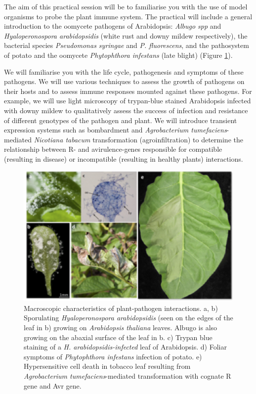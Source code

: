 \documentclass[12pt,]{book}
\theoremstyle{definition}
\theoremstyle{definition}
\theoremstyle{remark}
\begin{document}
The aim of this practical session will be to familiarise you with the
use of model organisms to probe the plant immune system. The practical
will include a general introduction to the oomycete pathogens of
Arabidopsis: \emph{Albugo spp} and \emph{Hyaloperonospora arabidopsidis}
(white rust and downy mildew respectively), the bacterial species
\emph{Pseudomonas syringae} and \emph{P. fluorescens}, and the
pathosystem of potato and the oomycete \emph{Phytophthora infestans}
(late blight) (Figure \ref{fig:leaves}).

We will familiarise you with the life cycle, pathogenesis and symptoms
of these pathogens. We will use various techniques to assess the growth
of pathogens on their hosts and to assess immune responses mounted
against these pathogens. For example, we will use light microscopy of
trypan-blue stained Arabidopsis infected with downy mildew to
qualitatively assess the success of infection and resistance of
different genotypes of the pathogen and plant. We will introduce
transient expression systems such as bombardment and \emph{Agrobacterium
tumefaciens}-mediated \emph{Nicotiana tabacum} transformation
(agroinfiltration) to determine the relationship between R- and
avirulence-genes responsible for compatible (resulting in disease) or
incompatible (resulting in healthy plants) interactions.











\begin{figure}
\includegraphics[width=6.48in]{assets/jones_fig2_prac} \caption{Macroscopic characteristics of plant-pathogen
interactions. a, b) Sporulating \emph{Hyaloperonospora arabidopsidis}
(seen on the edges of the leaf in b) growing on \emph{Arabidopsis
thaliana} leaves. Albugo is also growing on the abaxial surface of the
leaf in b. c) Trypan blue staining of a \emph{H. arabidopsidis-infected}
leaf of Arabidopsis. d) Foliar symptoms of \emph{Phytophthora infestans}
infection of potato. e) Hypersensitive cell death in tobacco leaf
resulting from \emph{Agrobacterium tumefaciens}-mediated transformation
with cognate R gene and Avr gene.}\label{fig:leaves}
\end{figure}
\end{document}
